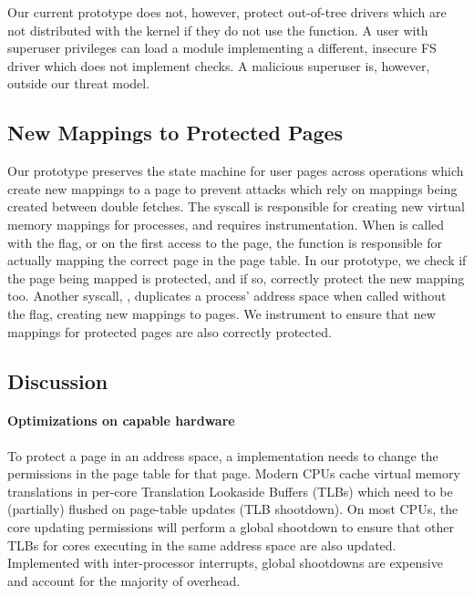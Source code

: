 \documentclass[letterpaper,twocolumn,10pt]{article}
\begin{document}
Our current prototype does not, however, protect out-of-tree drivers
which are not distributed with the kernel if they do not use the 
 function.
A user with superuser privileges can load a module implementing a 
different, insecure FS driver which does not implement \tiktok checks.
A malicious superuser is, however, outside our threat model.
%


\subsection{New Mappings to Protected Pages}

Our \tiktok prototype preserves the state machine for user pages
across operations which create new mappings to a page to prevent 
attacks which rely on mappings being created between double fetches.
The  syscall is responsible for creating new virtual
memory mappings for processes, and requires instrumentation.
When  is called with the  flag, or 
on the first access to the page, the  function 
is responsible for actually mapping the correct page in the 
page table. 
In our prototype, we check if the page being mapped is protected, 
and if so, correctly protect the new mapping too.
Another syscall, , duplicates a process' address space
when called without the  flag, creating new mappings
to pages. 
We instrument  to ensure that new mappings for protected 
pages are also correctly protected.


\subsection{Discussion}

\paragraph{Optimizations on capable hardware}
To protect a page in an address space, a \tiktok implementation 
needs to change the permissions in the page table for that page.
Modern CPUs cache virtual memory translations in per-core 
Translation Lookaside Buffers (TLBs) which need to be (partially) 
flushed on page-table updates (TLB shootdown).
On most CPUs, the core updating permissions will perform a global 
shootdown to ensure that other TLBs for cores executing in the 
same address space are also updated.
Implemented with inter-processor interrupts, global shootdowns 
are expensive and account for the majority of \tiktok overhead.
\end{document}
